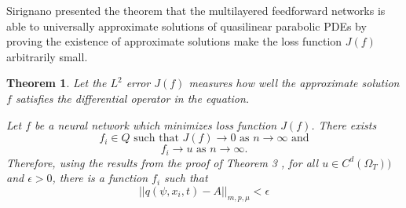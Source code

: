 \documentclass{article}
\newtheorem{theorem}{Theorem}[section]
\begin{document}
Sirignano \cite{sirignano} presented the theorem that the multilayered feedforward networks is able to universally approximate solutions of quasilinear parabolic PDEs by proving the existence of approximate solutions make the loss function $J(f)$ arbitrarily small.

\begin{theorem}\cite{sirignano}
	Let the $L^{2}$ error $J(f)$ measures how well the approximate solution $f$ satisfies the differential operator in the equation.

	\noindent \medspace
	Let $f$ be a neural network which minimizes loss function $J(f)$. There exists
	\[f_i \in \textit{Q} \textrm{ such that } J(f) \rightarrow 0 \textrm{ as } n \rightarrow \infty \text{ and}\]
	\[ f_{i} \rightarrow u  \text{ as } n \rightarrow \infty.\] Therefore, using the results from the proof of Theorem 3 \cite{hornik}, for all $u \in C^{d}(\Omega_{T}))$ and $\epsilon > 0$, there is a function $f_{i}$ such that
	\begin{equation}\label{eq:m_dense}
	||q(\psi, x_{i},t)-A||_{m,p,\mu} < \epsilon
	\end{equation}


\end{theorem}
\end{document}
